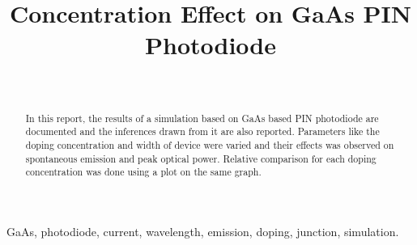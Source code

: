 \documentclass[conference]{IEEEtran}
\begin{document}
\title{Concentration Effect on GaAs PIN Photodiode\\
}

\author{
\and
{}
\\
\and

}
\maketitle

\begin{abstract}
In this report, the results of a simulation based on GaAs based PIN photodiode are documented and the inferences drawn from it are also reported. Parameters like the doping concentration and width of device were varied and their effects was observed on spontaneous emission and peak optical power. Relative comparison for each doping concentration was done using a plot on the same graph. \\
\end{abstract}

\begin{IEEEkeywords}
GaAs, photodiode, current, wavelength, emission, doping, junction, simulation.
\end{IEEEkeywords}
\end{document}
